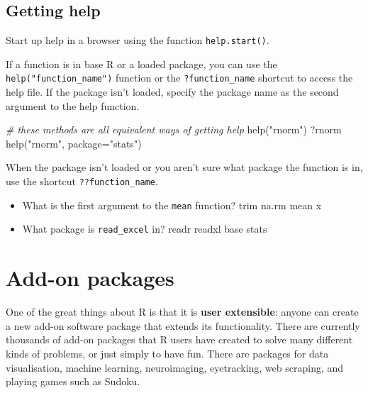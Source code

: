 \documentclass[
  oneside]{book}
\newenvironment{Shaded}{\begin{snugshade}}{\end{snugshade}}
\newcommand{\AttributeTok}[1]{\textcolor[rgb]{0.77,0.63,0.00}{#1}}
\newcommand{\CommentTok}[1]{\textcolor[rgb]{0.56,0.35,0.01}{\textit{#1}}}
\newcommand{\FunctionTok}[1]{\textcolor[rgb]{0.00,0.00,0.00}{#1}}
\newcommand{\NormalTok}[1]{#1}
\newcommand{\StringTok}[1]{\textcolor[rgb]{0.31,0.60,0.02}{#1}}
\providecommand{\tightlist}{%
  \setlength{\itemsep}{0pt}\setlength{\parskip}{0pt}}
\begin{document}
\hypertarget{help}{%
\subsection{Getting help}\label{help}}

Start up help in a browser using the function \texttt{help.start()}.

If a function is in base R or a loaded package, you can use the \texttt{help("function\_name")} function or the \texttt{?function\_name} shortcut to access the help file. If the package isn't loaded, specify the package name as the second argument to the help function.

\begin{Shaded}
\begin{Highlighting}[]
\CommentTok{\# these methods are all equivalent ways of getting help}
\FunctionTok{help}\NormalTok{(}\StringTok{"rnorm"}\NormalTok{)}
\NormalTok{?rnorm}
\FunctionTok{help}\NormalTok{(}\StringTok{"rnorm"}\NormalTok{, }\AttributeTok{package=}\StringTok{"stats"}\NormalTok{) }
\end{Highlighting}
\end{Shaded}

When the package isn't loaded or you aren't sure what package the function is in, use the shortcut \texttt{??function\_name}.

\begin{try}

\begin{itemize}
\tightlist
\item
  What is the first argument to the \texttt{mean} function? trim na.rm mean x
\item
  What package is \texttt{read\_excel} in? readr readxl base stats
\end{itemize}

\end{try}

\hypertarget{install-package}{%
\section{Add-on packages}\label{install-package}}

One of the great things about R is that it is \textbf{user extensible}: anyone can create a new add-on software package that extends its functionality. There are currently thousands of add-on packages that R users have created to solve many different kinds of problems, or just simply to have fun. There are packages for data visualisation, machine learning, neuroimaging, eyetracking, web scraping, and playing games such as Sudoku.
\end{document}
